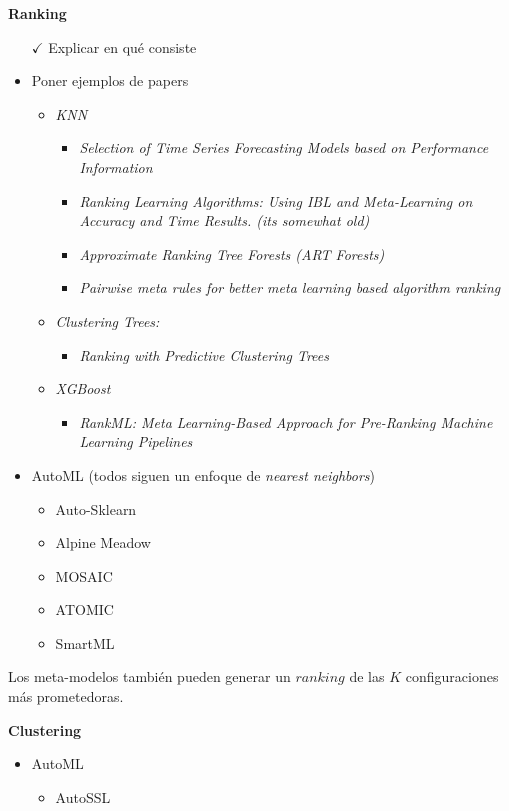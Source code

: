 \textbf{Ranking}

\begin{itemize}
	\item[$\checkmark$] Explicar en qué consiste
	\item Poner ejemplos de papers
	\begin{itemize}
		\item \textit{KNN} 	
		\begin{itemize}
			\item \textit{Selection of Time Series Forecasting Models based on Performance Information}
			\item \textit{Ranking Learning Algorithms: Using IBL and Meta-Learning on Accuracy and Time Results. (its somewhat old)}
			\item \textit{Approximate Ranking Tree Forests (ART Forests)}
			\item \textit{Pairwise meta rules for better meta learning based algorithm ranking}	
		\end{itemize}
		\item \textit{Clustering Trees:}
		\begin{itemize}
			\item \textit{Ranking with Predictive Clustering Trees}
		\end{itemize}
		\item \textit{XGBoost}
		\begin{itemize}
			\item \textit{RankML: Meta Learning-Based Approach for Pre-Ranking Machine Learning Pipelines}
		\end{itemize}
	\end{itemize}
	\item AutoML (todos siguen un enfoque de \textit{nearest neighbors}) \begin{itemize}
		\item Auto-Sklearn
		\item Alpine Meadow
		\item MOSAIC
		\item ATOMIC
		\item SmartML
	\end{itemize}
\end{itemize}

\quad

Los meta-modelos también pueden generar un $ranking$ de las $K$ configuraciones más prometedoras. 

\quad

\textbf{Clustering}

\begin{itemize}
	\item AutoML \begin{itemize}
		\item AutoSSL
	\end{itemize}
\end{itemize}

